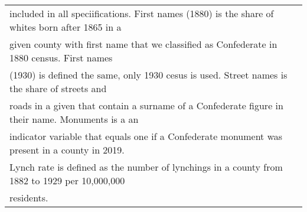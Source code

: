 \begin{table}
\begin{tabular}[t]{lccccc}
\multicolumn{6}{l}{included in all speciifications. First names (1880) is the share of whites born after 1865 in a}\\
\multicolumn{6}{l}{given county with first name that we classified as Confederate in 1880 census. First names}\\
\multicolumn{6}{l}{(1930) is defined the same, only 1930 cesus is used. Street names is the share of streets and}\\
\multicolumn{6}{l}{roads in a given that contain a surname of a Confederate figure in their name. Monuments is a an}\\
\multicolumn{6}{l}{indicator variable that equals one if a Confederate monument was present in a county in 2019.}\\
\multicolumn{6}{l}{Lynch rate is defined as the number of lynchings in a county from 1882 to 1929 per 10,000,000}\\
\multicolumn{6}{l}{residents.}\\
\end{tabular}
\end{table}
